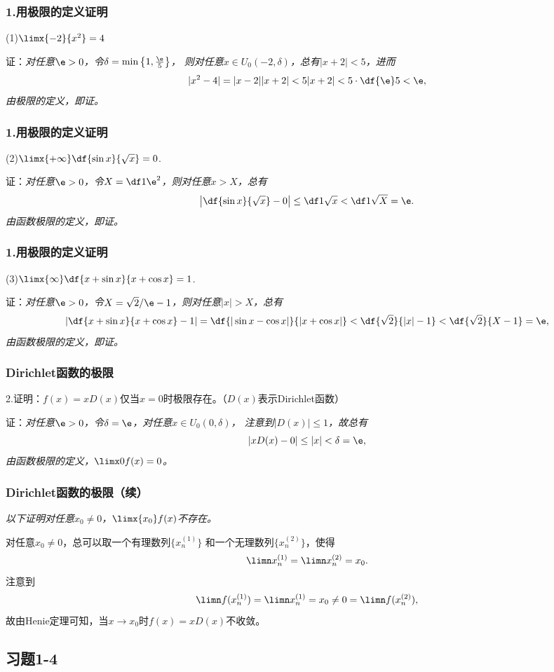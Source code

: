 \begin{frame}[t]\frametitle{1.用极限的定义证明}
\large
(1)$\limx{-2}{x^2}=4$

证：\it 对任意$\e>0$，令$\delta=\min\left\{1,\frac{\e}5\right\}$，
则对任意$x\in U_0(-2,\delta)$，总有$|x+2|<5$，进而
$$|x^2-4|=|x-2||x+2|<5|x+2|<5\cdot\df{\e}5<\e,$$
由极限的定义，即证。\fin
\end{frame}

\begin{frame}[t]\frametitle{1.用极限的定义证明}
\large

(2)$\limx{+\infty}\df{\sin x}{\sqrt x}=0$.

证：\it 对任意$\e>0$，令$X=\df1{\e^2}$，则对任意$x>X$，总有
$$\left|\df{\sin x}{\sqrt x}-0\right|\leq\df1{\sqrt x}
<\df1{\sqrt X}=\e.$$
由函数极限的定义，即证。\fin
\end{frame}

\begin{frame}[t]\frametitle{1.用极限的定义证明}
\large

(3)$\limx{\infty}\df{x+\sin x}{x+\cos x}=1$.
\bs

证：\it 对任意$\e>0$，令$X=\sqrt2/\e-1$，则对任意$|x|>X$，总有
$$\left|\df{x+\sin x}{x+\cos x}-1\right|
=\df{|\sin x-\cos x|}{|x+\cos x|}
<\df{\sqrt2}{|x|-1}<\df{\sqrt2}{X-1}=\e,$$
由函数极限的定义，即证。\fin
\end{frame}

\begin{frame}[t]\frametitle{Dirichlet函数的极限}
\large

2.证明：$f(x)=xD(x)$仅当$x=0$时极限存在。（$D(x)$表示Dirichlet函数）
\bs

证：\it 对任意$\e>0$，令$\delta=\e$，对任意$x\in U_0(0,\delta)$，
注意到$|D(x)|\leq 1$，故总有
$$|xD(x)-0|\leq |x|<\delta=\e,$$
由函数极限的定义，$\limx0f(x)=0$。
\end{frame}

\begin{frame}[t]\frametitle{Dirichlet函数的极限（续）}
\large
\it
以下证明对任意$x_0\ne 0$，$\limx{x_0}f(x)$不存在。

对任意$x_0\ne0$，总可以取一个有理数列$\{x_n^{(1)}\}$
和一个无理数列$\{x_n^{(2)}\}$，使得
$$\limn x_n^{(1)}=\limn x_n^{(2)}=x_0.$$
注意到
$$\limn f(x_n^{(1)})=\limn x_n^{(1)}=x_0
\ne 0=\limn f(x_n^{(2)}),$$
故由Henie定理可知，当$x\to x_0$时$f(x)=xD(x)$不收敛。\fin
\end{frame}

\subsection{习题1-4}

